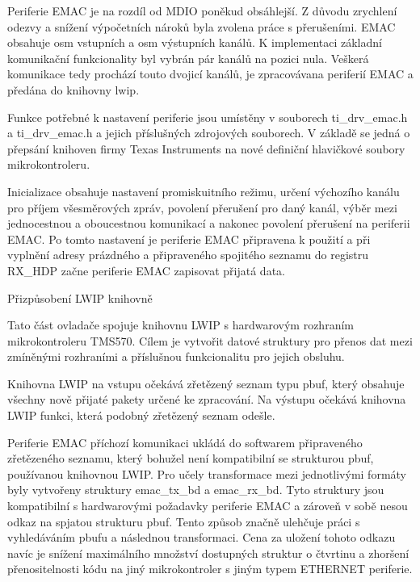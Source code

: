 Periferie EMAC je na rozdíl od MDIO poněkud obsáhlejší.
Z důvodu zrychlení odezvy a snížení výpočetních nároků byla zvolena práce s přerušeními.
EMAC obsahuje osm vstupních a osm výstupních kanálů.
K implementaci základní komunikační funkcionality byl vybrán pár kanálů na pozici nula.
Veškerá komunikace tedy prochází touto dvojicí kanálů, je zpracovávana periferií EMAC a předána do knihovny lwip.

Funkce potřebné k nastavení periferie jsou umístěny v souborech ti\_drv\_emac.h a ti\_drv\_emac.h a jejich příslušných zdrojových souborech.
V základě se jedná o přepsání knihoven firmy Texas Instruments na nové definiční hlavičkové soubory mikrokontroleru.

Inicializace obsahuje nastavení promiskuitního režimu, určení výchozího kanálu pro příjem všesměrových zpráv, povolení přerušení pro daný kanál, výběr mezi jednocestnou a oboucestnou komunikací a nakonec povolení přerušení na periferii EMAC.
Po tomto nastavení je periferie EMAC připravena k použití a při vyplnění adresy prázdného a připraveného spojitého seznamu do registru RX\_HDP začne periferie EMAC zapisovat přijatá data.

\secc Přizpůsobení LWIP knihovně

Tato část ovladače spojuje knihovnu LWIP s hardwarovým rozhraním mikrokontroleru TMS570.
Cílem je vytvořit datové struktury pro přenos dat mezi zmíněnými rozhraními a příslušnou funkcionalitu pro jejich obsluhu.

Knihovna LWIP na vstupu očekává zřetězený seznam typu pbuf, který obsahuje všechny nově přijaté pakety určené ke zpracování.
Na výstupu očekává knihovna LWIP funkci, která podobný zřetězený seznam odešle.  

Periferie EMAC příchozí komunikaci ukládá do softwarem připraveného zřetězeného seznamu, který bohužel není kompatibilní se strukturou pbuf, používanou knihovnou LWIP.
Pro učely transformace mezi jednotlivými formáty byly vytvořeny struktury emac\_tx\_bd a emac\_rx\_bd.
Tyto struktury jsou kompatibilní s hardwarovými požadavky periferie EMAC a zároveň v sobě nesou odkaz na spjatou strukturu pbuf.
Tento způsob značně ulehčuje práci s vyhledáváním pbufu a následnou transformaci.
Cena za uložení tohoto odkazu navíc je snížení maximálního množství dostupných struktur o čtvrtinu a zhoršení přenositelnosti kódu na jiný mikrokontroler s jiným typem ETHERNET periferie.

